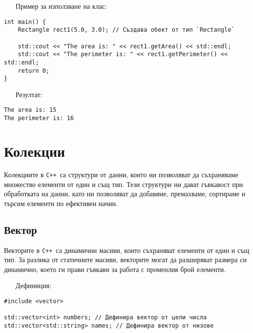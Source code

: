 \documentclass[oneside]{book}
\newcommand*{\cpp}{\texttt{C++}\ }
\begin{document}
\begin{itemize}\item[Пример] за използване на клас:\end{itemize}
\begin{mdframed}\begin{lstlisting}
int main() {
    Rectangle rect1(5.0, 3.0); // Създава обект от тип `Rectangle`

    std::cout << "The area is: " << rect1.getArea() << std::endl;
    std::cout << "The perimeter is: " << rect1.getPerimeter() << std::endl;
    return 0;
}
\end{lstlisting}\end{mdframed}

\begin{itemize}\item[Резултат:]\end{itemize}
\begin{mdframed}\begin{lstlisting}[language={}]
The area is: 15
The perimeter is: 16
\end{lstlisting}\end{mdframed}

\section{Колекции}
Колекциите в \cpp са структури от данни, които ни позволяват да съхраняваме множество елементи от един и същ тип. Тези структури ни дават гъвкавост при обработката на данни, като ни позволяват да добавяме, премахваме, сортираме и търсим елементи по ефективен начин.

\subsection{Вектор}
Векторите в \cpp са динамични масиви, които съхраняват елементи от един и същ тип. За разлика от статичните масиви, векторите могат да разширяват размера си динамично, което ги прави гъвкави за работа с променлив брой елементи.

\begin{itemize}\item[Дефиниция:]\end{itemize}
\begin{mdframed}\begin{lstlisting}
#include <vector>

std::vector<int> numbers; // Дефинира вектор от цели числа
std::vector<std::string> names; // Дефинира вектор от низове
\end{lstlisting}\end{mdframed}
\end{document}
